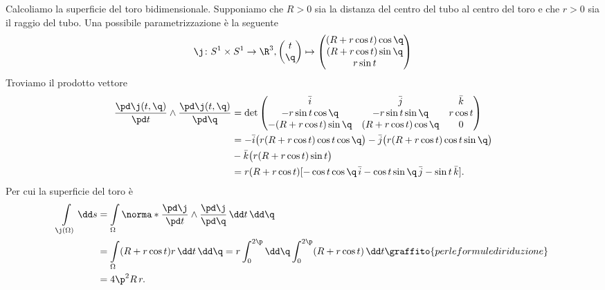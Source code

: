 \begin{ese}
	Calcoliamo la superficie del toro bidimensionale.
	Supponiamo che \(R>0\) sia la distanza del centro del tubo al centro del toro e che \(r>0\) sia il raggio del tubo.
	Una possibile parametrizzazione è la seguente
	\[
		\j \colon S^1 \times S^1 \to \R^3, \begin{pmatrix}t\\\q\end{pmatrix} \mapsto 	\begin{pmatrix}
			(R+r\cos t)\cos \q \\
			(R+r\cos t)\sin \q \\
			r\sin t
		\end{pmatrix}
	\]
	Troviamo il prodotto vettore
	\[
		\begin{split}
			\frac{\pd \j(t,\q)}{\pd t} \wedge \frac{\pd \j(t,\q)}{\pd \q} & = \det  \begin{pmatrix}
				\bar{i}             & \bar{j}            & \bar{k}  \\
				-r \sin t \cos \q   & -r \sin t \sin \q  & r \cos t \\
				-(R+r\cos t)\sin \q & (R+r\cos t)\cos \q & 0
			\end{pmatrix}\\
			& = -\bar{i}\big(r(R+r\cos t)\cos t\cos \q\big) -\bar{j}\big(r(R+r\cos t)\cos t\sin \q\big) \\
			& -\bar{k}\big(r(R+r\cos t)\sin t\big)\\
			& = r(R+r\cos t)[-\cos t \cos \q\, \bar{i} - \cos t \sin \q\, \bar{j} - \sin t\, \bar{k}].
		\end{split}
	\]
	Per cui la superficie del toro è
	\[
		\begin{split}
			\int\limits_{\j(\Omega)}\dd s & = \int\limits_\Omega \norma*{\frac{\pd \j}{\pd t} \wedge \frac{\pd \j}{\pd \q}}\,\dd t\,\dd \q\\
			& = \int\limits_\Omega (R+r\cos t)r\,\dd t\,\dd \q = r \int_0^{2\p} \dd \q \int_0^{2\p} (R+r\cos t)\,\dd t\graffito{per le formule di riduzione}\\
			& = 4\p^2 R\, r.
		\end{split}
	\]
\end{ese}

